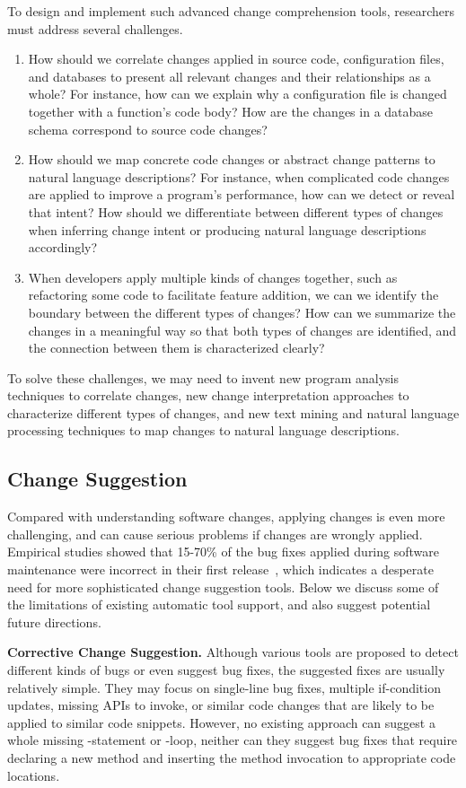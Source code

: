To design and implement such advanced change comprehension tools, researchers must address several challenges. 
\begin{enumerate}
\item How should we correlate changes applied in source code, configuration files, and databases to present all relevant changes and their relationships as a whole? For instance, how can we explain why a configuration file is changed together with a function's code body? How are the changes in a database schema correspond to source code changes?
\item How should we map concrete code changes or abstract change patterns to natural language descriptions? For instance, when complicated code changes are applied to improve a program's  performance, how can we detect or reveal that intent? How should we differentiate between different types of changes when inferring change intent or producing natural language descriptions accordingly?
\item When developers apply multiple kinds of changes together, such as refactoring some code to facilitate feature addition, we can we identify the boundary between the different types of changes? How can we summarize the changes in a meaningful way so that both types of changes are identified, and the connection between them is characterized clearly? 
\end{enumerate}
To solve these challenges, we may need to invent new program analysis techniques to correlate changes, new change interpretation approaches to characterize different types of changes,
and new text mining and natural language processing techniques to map changes to natural language descriptions.

\subsection{Change Suggestion}
Compared with understanding software changes, applying changes is even more challenging, and can cause serious problems if changes are wrongly applied. Empirical studies showed that 15-70\% of the bug fixes applied during software maintenance were incorrect in their first release~\cite{Sidiroglou:2007:BP,Yin2011:FBB}, which indicates a desperate need for more sophisticated change suggestion tools. 
Below we discuss some of the limitations of existing automatic tool support, and also suggest potential future directions.


\textbf{Corrective Change Suggestion.} Although various tools are proposed to detect different kinds of bugs or even suggest bug fixes, the suggested fixes are usually relatively simple. They may focus on single-line bug fixes, multiple if-condition updates, missing APIs to invoke, or similar code changes that are likely to be applied to similar code snippets. However, no existing approach can suggest a whole missing -statement or -loop, neither can they suggest bug fixes that require declaring a new method and inserting the method invocation to appropriate code locations.

